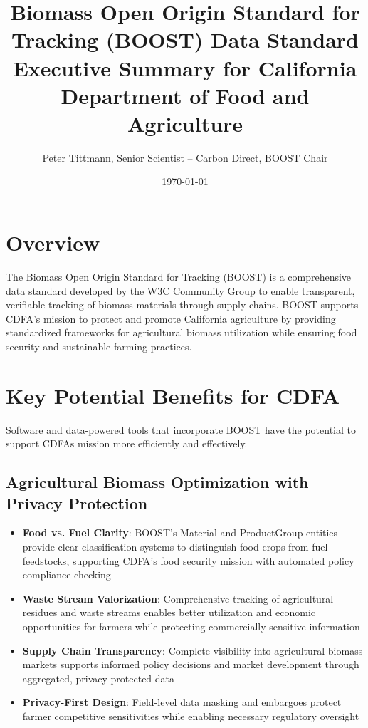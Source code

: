 \documentclass[title=small,preset=opensansnote,par=skip]{article}
\author{Peter Tittmann, Senior Scientist -- Carbon Direct, BOOST Chair}
\date{\today}
\title{Biomass Open Origin Standard for Tracking (BOOST) Data Standard\\\medskip
\large Executive Summary for California Department of Food and Agriculture}
\begin{document}
\maketitle
\section{Overview}
\label{sec:orgc3d03ed}

The Biomass Open Origin Standard for Tracking (BOOST) is a comprehensive data standard developed by the W3C Community Group to enable transparent, verifiable tracking of biomass materials through supply chains. BOOST supports CDFA's mission to protect and promote California agriculture by providing standardized frameworks for agricultural biomass utilization while ensuring food security and sustainable farming practices.
\section{Key Potential Benefits for CDFA}
\label{sec:org6370919}

Software and data-powered tools that incorporate BOOST have the potential to support CDFAs mission more efficiently and effectively.
\subsection{Agricultural Biomass Optimization with Privacy Protection}
\label{sec:org38d7e07}
\begin{itemize}
\item \textbf{Food vs. Fuel Clarity}: BOOST's Material and ProductGroup entities provide clear classification systems to distinguish food crops from fuel feedstocks, supporting CDFA's food security mission with automated policy compliance checking
\item \textbf{Waste Stream Valorization}: Comprehensive tracking of agricultural residues and waste streams enables better utilization and economic opportunities for farmers while protecting commercially sensitive information
\item \textbf{Supply Chain Transparency}: Complete visibility into agricultural biomass markets supports informed policy decisions and market development through aggregated, privacy-protected data
\item \textbf{Privacy-First Design}: Field-level data masking and embargoes protect farmer competitive sensitivities while enabling necessary regulatory oversight
\end{itemize}
\end{document}
